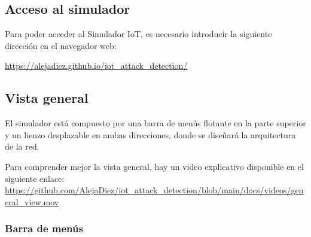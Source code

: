 \subsection{Acceso al simulador}
\label{subsec:AccesoSimulador}
Para poder acceder al Simulador IoT, es necesario introducir la siguiente dirección en el navegador web:

\begin{center}
    \url{https://alejadiez.github.io/iot_attack_detection/}
\end{center}

\newpage
\subsection{Vista general}
\label{subsec:VistaGeneral}
El simulador está compuesto por una barra de menús flotante en la parte superior y un lienzo desplazable en ambas direcciones, donde se diseñará la arquitectura de la red.


Para comprender mejor la vista general, hay un video explicativo disponible en el siguiente enlace: \url{https://github.com/AlejaDiez/iot_attack_detection/blob/main/docs/videos/general_view.mov}

\subsubsection{Barra de menús}
\label{subsubsec:BarraMenus}

